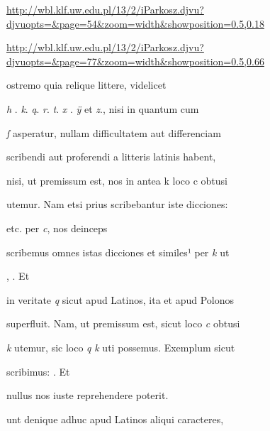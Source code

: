 
\newParkoszpage

{
\url{http://wbl.klf.uw.edu.pl/13/2/iParkosz.djvu?djvuopts=&page=54&zoom=width&showposition=0.5,0.18}

\url{http://wbl.klf.uw.edu.pl/13/2/iParkosz.djvu?djvuopts=&page=77&zoom=width&showposition=0.5,0.66}
}

\bigskip

\obeylines
\mono



\fullpreviouslines


{
\color{blue}

\indentP {}ostremo quia relique littere, videlicet 

\textit{h} . \textit{k}. \textit{ą}. \textit{r}. \textit{t}. \textit{x} . \textit{ÿ} et \textit{z}., nisi in quantum cum 

\textit{ſ} asperatur, nullam difficultatem aut  differenciam 

scribendi aut proferendi a litteris latinis habent, 
}


\fulllines

nisi, ut premissum est, nos in antea k loco c obtusi

utemur. Nam etsi prius scribebantur iste dicciones:  

    etc. per \textit{c}, nos deinceps

scribemus omnes istas dicciones et similes¹ per \textit{k} ut 

 ,    . Et

in veritate \textit{q} sicut apud Latinos, ita et apud Polonos

superfluit. Nam, ut premissum est, sicut loco \textit{c} obtusi

\textit{k} utemur, sic loco \textit{q} \textit{k} uti possemus. Exemplum sicut 

scribimus:     . Et 

nullus nos iuste reprehendere poterit. 

unt denique adhuc apud Latinos aliqui caracteres,

